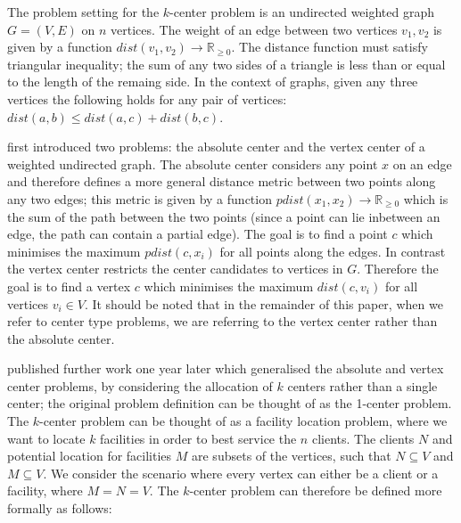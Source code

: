 The problem setting for the $k$-center problem  is an undirected weighted graph $G=(V,E)$ on $n$ vertices. The weight of an edge between two vertices $v_1, v_2$ is given by a function $dist(v_1,v_2)\rightarrow\mathbb{R}_{\ge 0}$. The distance function must satisfy triangular inequality; the sum of any two sides of a triangle is less than or equal to the length of the remaing side. In the context of graphs, given any three vertices the following holds for any pair of vertices: \(dist(a,b) \leq dist(a, c) + dist(b, c) \).

\textcite{hakimi_optimum_1964} first introduced two problems: the absolute center and the vertex center of a weighted undirected graph. The absolute center considers any point $x$ on an edge and therefore defines a more general distance metric between two points along any two edges; this metric is given by a function $pdist(x_1,x_2)\rightarrow\mathbb{R}_{\ge 0}$ which is the sum of the path between the two points (since a point can lie inbetween an edge, the path can contain a partial edge). The goal is to find a point $c$ which minimises the maximum $pdist(c,x_i)$ for all points along the edges. In contrast the vertex center restricts the center candidates to vertices in $G$. Therefore the goal is to find a vertex $c$ which minimises the maximum $dist(c, v_i)$ for all vertices $v_i\in V$. It should be noted that in the remainder of this paper, when we refer to center type problems, we are referring to the vertex center rather than the absolute center. 

\textcite{hakimi_optimum_1965} published further work one year later which generalised the absolute and vertex center problems, by considering the allocation of $k$ centers rather than a single center; the original problem definition can be thought of as the 1-center problem. The $k$-center problem can be thought of as a facility location problem, where we want to locate $k$ facilities in order to best service the $n$ clients. The clients $N$ and potential location for facilities $M$ are subsets of the vertices, such that $N\subseteq V$ and $M\subseteq V$. We consider the scenario where every vertex can either be a client or a facility, where $M=N=V$. The $k$-center problem can therefore be defined more formally as follows:


